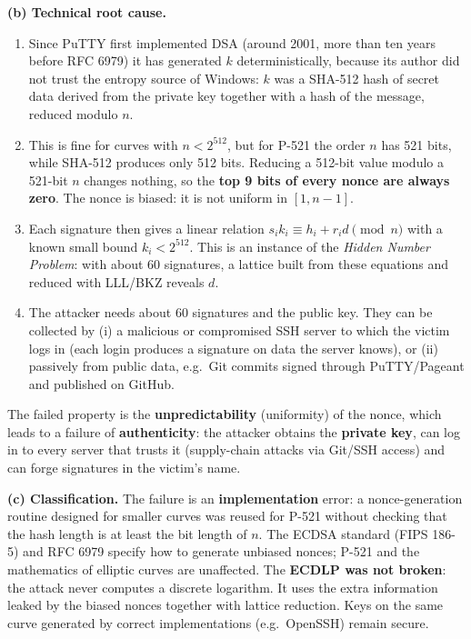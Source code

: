 \documentclass[11pt,a4paper]{article}
\begin{document}
\textbf{(b) Technical root cause.}
\begin{enumerate}
\item Since PuTTY first implemented DSA (around 2001, more than ten years before RFC 6979) it has generated $k$
deterministically, because its author did not trust the entropy source of Windows: $k$ was a SHA-512 hash of
secret data derived from the private key together with a hash of the message, reduced modulo $n$.
\item This is fine for curves with $n < 2^{512}$, but for P-521 the order $n$ has 521 bits, while SHA-512
produces only 512 bits. Reducing a 512-bit value modulo a 521-bit $n$ changes nothing, so the
\textbf{top 9 bits of every nonce are always zero}. The nonce is biased: it is not uniform in $[1,n-1]$.
\item Each signature then gives a linear relation $s_i k_i \equiv h_i + r_i d \pmod n$ with a known small bound
$k_i < 2^{512}$. This is an instance of the \emph{Hidden Number Problem}: with about 60 signatures,
a lattice built from these equations and reduced with LLL/BKZ reveals $d$.
\item The attacker needs about 60 signatures and the public key. They can be collected by (i) a malicious or
compromised SSH server to which the victim logs in (each login produces a signature on data the server knows), or
(ii) passively from public data, e.g.\ Git commits signed through PuTTY/Pageant and published on GitHub.
\end{enumerate}
The failed property is the \textbf{unpredictability} (uniformity) of the nonce, which leads to a failure of
\textbf{authenticity}: the attacker obtains the \textbf{private key}, can log in to every server that trusts it
(supply-chain attacks via Git/SSH access) and can forge signatures in the victim's name.

\textbf{(c) Classification.} The failure is an \textbf{implementation} error: a nonce-generation routine
designed for smaller curves was reused for P-521 without checking that the hash length is at least the bit length of $n$.
The ECDSA standard (FIPS 186-5) and RFC 6979 specify how to generate unbiased nonces; P-521 and the
mathematics of elliptic curves are unaffected. The \textbf{ECDLP was not broken}: the attack never
computes a discrete logarithm. It uses the extra information leaked by the biased nonces together with lattice
reduction. Keys on the same curve generated by correct implementations (e.g.\ OpenSSH) remain secure.
\end{document}
